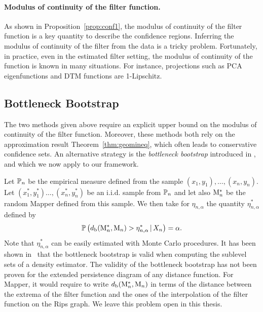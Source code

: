 \paragraph{Modulus of continuity of the filter function.} As shown in Proposition~\ref{prop:conf1}, the modulus of continuity 
of the filter function is a key quantity to describe the confidence regions. 
Inferring the modulus of continuity of the filter from the data is a tricky problem. 
Fortunately, in practice, even in the estimated filter setting, 
the modulus of continuity of the function is known in many situations. For instance, projections  such as PCA eigenfunctions and
DTM functions are 1-Lipschitz. 

\subsection{Bottleneck Bootstrap}\label{sec:bootstrap}

The two methods given above require an explicit upper bound on the modulus of continuity of the filter function.  
Moreover, these methods both rely on the approximation result Theorem~\ref{thm:geomineq}, which often leads to conservative confidence sets. 
An alternative strategy is the {\em bottleneck bootstrap} introduced in \cite{Chazal14b},
and which we now apply to our framework.  
 
Let $\mathbb{P}_n$ be the empirical measure defined from the sample $(x_1,y_1), \ldots, (x_n,y_n)$. Let $(x_1^*,y_1^*)\dots, (x_n^*,y_n^*)$ 
be an i.i.d. sample from $\mathbb{P}_n$ and let also $\mathrm{M}_n^*$ be the random Mapper defined from this sample. We then take 
for $\eta_{n,\alpha}$ the quantity  $\eta_{n,\alpha}^*$ defined by
\begin{equation}
\mathbb{P}\left( d_{\rm b} ( \mathrm{M}_n^*, \mathrm{M}_n) > \eta_{n,\alpha}^* \, |\, X_n\right) = \alpha.
\end{equation}
Note that $\eta_{n,\alpha}^*$ can be easily estimated with Monte Carlo procedures. 
It has been shown in~\cite{Chazal14b} that the bottleneck bootstrap is valid when computing 
the sublevel sets of a density estimator. The validity of the bottleneck bootstrap has not been proven
for the extended persistence diagram of any distance function. For Mapper, it would require to write  
$d_{\rm b} ( \mathrm{M}_n^*, \mathrm{M}_n)$ in terms of the distance between the extrema of the filter function and 
the ones of the interpolation of the filter function on the Rips graph. We leave this problem open in this thesis.

